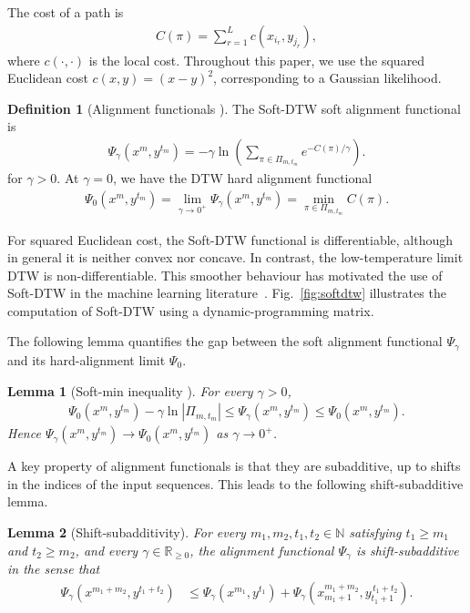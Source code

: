 \documentclass[onecolumn]{IEEEtran}
\newtheorem{lemma}{Lemma}
\theoremstyle{definition}
\newtheorem{definition}{Definition}
\begin{document}
The cost of a path is
\begin{align*}
    C(\pi) = \sum_{r=1}^{L} c(x_{i_r},y_{j_r}),
\end{align*}
where \(c(\cdot,\cdot)\) is the local cost. {Throughout this
paper, we use the squared Euclidean cost
\(c(x,y)=(x-y)^2\), corresponding to a Gaussian likelihood.}

\begin{definition}[Alignment functionals \cite{Cuturi2017}] 
The Soft-DTW soft alignment functional is
\begin{align}
    \Psi_{\gamma}(x^m,y^{t_m})
    = -\gamma \ln\left(\sum_{\pi\in\Pi_{m,t_m}} e^{-C(\pi)/\gamma} \right).
\end{align}
for \(\gamma>0\). At \(\gamma = 0\), we have the DTW hard alignment functional
\begin{align}
    \Psi_{0}(x^m,y^{t_m})
    = \lim_{\gamma \rightarrow 0^+} \Psi_{\gamma}(x^m,y^{t_m}) = \min_{\pi\in \Pi_{m,t_m}} C(\pi).
\end{align}
\end{definition}

For squared Euclidean cost, the Soft-DTW functional is differentiable, although in general it is neither convex nor concave. In contrast, the low-temperature limit DTW is non-differentiable. This smoother behaviour has motivated the use of Soft-DTW in the machine learning literature~\cite{Cuturi2017}. Fig.~\ref{fig:softdtw} illustrates the computation of Soft-DTW using a dynamic-programming matrix.

The following lemma quantifies the gap between the soft alignment functional \(\Psi_\gamma\) and its hard-alignment limit \(\Psi_0\).

\begin{lemma}[Soft-min inequality \cite{Cuturi2017}]\label{lemma:soft_min_inequality}
For every \(\gamma>0\),
\begin{align}
    \Psi_0(x^m,y^{t_m}) - \gamma \ln |\Pi_{m,t_m}|
    \le
    \Psi_\gamma(x^m,y^{t_m})
    \le
    \Psi_0(x^m,y^{t_m}).
\end{align}
Hence \(\Psi_\gamma(x^m,y^{t_m}) \to \Psi_0(x^m,y^{t_m})\) as \(\gamma\to 0^+\).
\end{lemma}

A key property of alignment functionals is that they are subadditive, up to shifts in the indices of the input sequences. This leads to the following shift-subadditive lemma.

\begin{lemma}[Shift-subadditivity]\label{lemma:subadditivity}
For every \(m_1,m_2,t_1,t_2 \in \mathbb{N}\) satisfying \(t_1 \ge m_1\) and \(t_2 \ge m_2\), and every \(\gamma \in \mathbb{R}_{\ge 0}\), the alignment functional \(\Psi_\gamma\) is shift-subadditive in the sense that
\begin{align}
    \Psi_{\gamma}(x^{m_1+m_2},y^{t_1+t_2})
    &\le
    \Psi_{\gamma}(x^{m_1},y^{t_1}) +
    \Psi_{\gamma}(x_{m_1+1}^{m_1+m_2},y_{t_1+1}^{\,t_1+t_2}).
\end{align}
\end{lemma}
\end{document}
